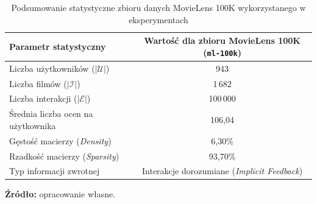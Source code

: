 ﻿\begin{table}[H]
    \centering
    \small
    \setlength{\tabcolsep}{6pt}
    \caption{Podsumowanie statystyczne zbioru danych MovieLens 100K wykorzystanego w eksperymentach}
    \label{tab:movielens_stats}
    \begin{tabular}{|l|c|}
        \hline
        \textbf{Parametr statystyczny}        & \textbf{Wartość dla zbioru MovieLens 100K (\texttt{ml-\allowbreak 100k})} \\ \hline
        Liczba użytkowników ($|\mathcal{U}|$) & 943                                                                       \\ \hline
        Liczba filmów ($|\mathcal{I}|$)       & 1\,682                                                                    \\ \hline
        Liczba interakcji ($|\mathcal{E}|$)   & 100\,000                                                                  \\ \hline
        Średnia liczba ocen na użytkownika    & 106{,}04                                                                  \\ \hline
        Gęstość macierzy (\textit{Density})   & 6{,}30\%                                                                  \\ \hline
        Rzadkość macierzy (\textit{Sparsity}) & 93{,}70\%                                                                 \\ \hline
        Typ informacji zwrotnej               & Interakcje dorozumiane (\textit{Implicit Feedback})                       \\ \hline
    \end{tabular}
    \vspace{1.5mm}

    {\raggedright \small \textbf{Źródło:} opracowanie własne.\par}
\end{table}
